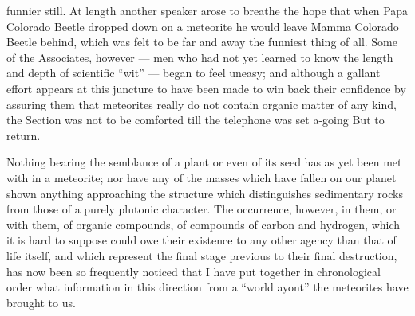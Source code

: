 \documentclass[a4paper, 11pt, oneside, english]{article}
\begin{document}
funnier still. At length another speaker arose to breathe the hope that when Papa Colorado Beetle dropped down on a meteorite he would leave Mamma Colorado Beetle behind, which was felt to be far and away the funniest thing of all. Some of the Associates, however --- men who had not yet learned to know the length and depth of scientific ``wit'' --- began to feel uneasy; and although a gallant effort appears at this juncture to have been made to win back their confidence by assuring them that meteorites really do not contain organic matter of any kind, the Section was not to be comforted till the telephone was set a-going But to return.

Nothing bearing the semblance of a plant or even of its seed has as yet been met with in a meteorite; nor have any of the masses which have fallen on our planet shown anything approaching the structure which distinguishes sedimentary rocks from those of a purely plutonic character. The occurrence, however, in them, or with them, of organic compounds, of compounds of carbon and hydrogen, which it is hard to suppose could owe their existence to any other agency than that of life itself, and which represent the final stage previous to their final destruction, has now been so frequently noticed that I have put together in chronological order what information in this direction from a ``world ayont'' the meteorites have brought to us.
\end{document}
